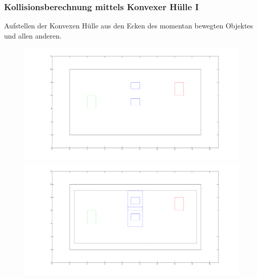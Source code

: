 \documentclass[final]{beamer}
\begin{document}
\begin{frame}
\frametitle{Kollisionsberechnung mittels Konvexer Hülle I }
Aufstellen der Konvexen Hülle aus den Ecken des momentan bewegten Objektes und allen anderen.
\begin{figure}
\centering
\includegraphics[scale=0.1]{../thesis/riddleWoHull}
\includegraphics[scale=0.1]{../thesis/riddleWHull}
\end{figure}
\end{frame}

\end{document}
